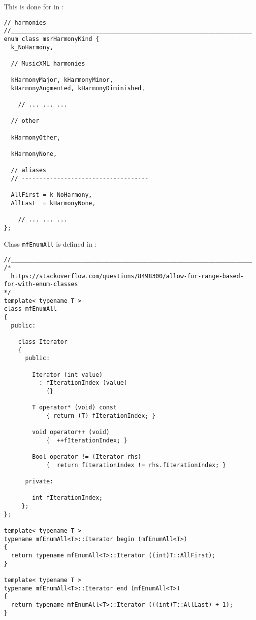 This is done for  in :
\begin{lstlisting}[language=CPlusPlus]
// harmonies
//______________________________________________________________________________
enum class msrHarmonyKind {
  k_NoHarmony,

  // MusicXML harmonies

  kHarmonyMajor, kHarmonyMinor,
  kHarmonyAugmented, kHarmonyDiminished,

	// ... ... ...

  // other

  kHarmonyOther,

  kHarmonyNone,

  // aliases
  // ------------------------------------

  AllFirst = k_NoHarmony,
  AllLast  = kHarmonyNone,

	// ... ... ...
};
\end{lstlisting}

Class {\tt mfEnumAll} is defined in :
\begin{lstlisting}[language=CPlusPlus]
//______________________________________________________________________________
/*
  https://stackoverflow.com/questions/8498300/allow-for-range-based-for-with-enum-classes
*/
template< typename T >
class mfEnumAll
{
  public:

    class Iterator
    {
      public:

        Iterator (int value)
          : fIterationIndex (value)
            {}

        T operator* (void) const
            { return (T) fIterationIndex; }

        void operator++ (void)
            {  ++fIterationIndex; }

        Bool operator != (Iterator rhs)
            {  return fIterationIndex != rhs.fIterationIndex; }

      private:

        int fIterationIndex;
     };
};

template< typename T >
typename mfEnumAll<T>::Iterator begin (mfEnumAll<T>)
{
  return typename mfEnumAll<T>::Iterator ((int)T::AllFirst);
}

template< typename T >
typename mfEnumAll<T>::Iterator end (mfEnumAll<T>)
{
  return typename mfEnumAll<T>::Iterator (((int)T::AllLast) + 1);
}
\end{lstlisting}

